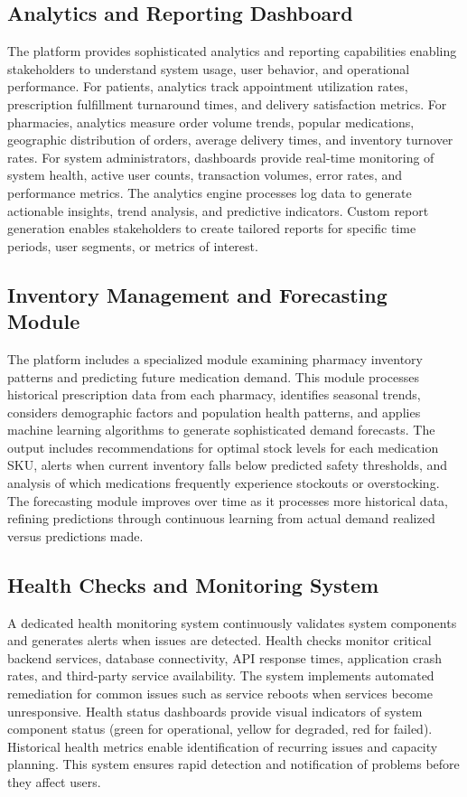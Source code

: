 \documentclass[12pt,a4paper]{report}
\begin{document}
\subsection{Analytics and Reporting Dashboard}

The platform provides sophisticated analytics and reporting capabilities enabling stakeholders to understand system usage, user behavior, and operational performance. For patients, analytics track appointment utilization rates, prescription fulfillment turnaround times, and delivery satisfaction metrics. For pharmacies, analytics measure order volume trends, popular medications, geographic distribution of orders, average delivery times, and inventory turnover rates. For system administrators, dashboards provide real-time monitoring of system health, active user counts, transaction volumes, error rates, and performance metrics. The analytics engine processes log data to generate actionable insights, trend analysis, and predictive indicators. Custom report generation enables stakeholders to create tailored reports for specific time periods, user segments, or metrics of interest.

\subsection{Inventory Management and Forecasting Module}

The platform includes a specialized module examining pharmacy inventory patterns and predicting future medication demand. This module processes historical prescription data from each pharmacy, identifies seasonal trends, considers demographic factors and population health patterns, and applies machine learning algorithms to generate sophisticated demand forecasts. The output includes recommendations for optimal stock levels for each medication SKU, alerts when current inventory falls below predicted safety thresholds, and analysis of which medications frequently experience stockouts or overstocking. The forecasting module improves over time as it processes more historical data, refining predictions through continuous learning from actual demand realized versus predictions made.

\subsection{Health Checks and Monitoring System}

A dedicated health monitoring system continuously validates system components and generates alerts when issues are detected. Health checks monitor critical backend services, database connectivity, API response times, application crash rates, and third-party service availability. The system implements automated remediation for common issues such as service reboots when services become unresponsive. Health status dashboards provide visual indicators of system component status (green for operational, yellow for degraded, red for failed). Historical health metrics enable identification of recurring issues and capacity planning. This system ensures rapid detection and notification of problems before they affect users.
\end{document}

